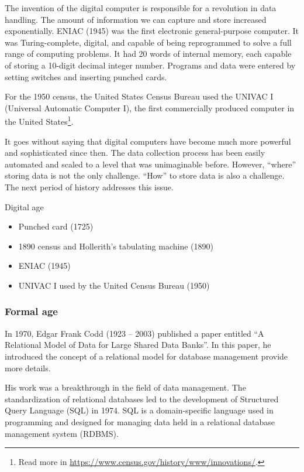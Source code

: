 The invention of the digital computer is responsible for a revolution in data handling.
The amount of information we can capture and store increased exponentially.  ENIAC (1945) was
the first electronic general-purpose computer.  It was Turing-complete, digital, and
capable of being reprogrammed to solve a full range of computing problems.
It had 20 words of internal memory, each capable of storing a 10-digit decimal integer number.
Programs and data were entered by setting switches and inserting punched cards.

For the 1950 census, the United States Census Bureau used the
UNIVAC I (Universal Automatic Computer I), the first commercially produced computer in the
United States\footnote{Read more in \url{https://www.census.gov/history/www/innovations/}.}.

It goes without saying that digital computers have become much more powerful and
sophisticated since then.  The data collection process has been easily automated and
scaled to a level that was unimaginable before.  However, ``where'' storing data is
not the only challenge.  ``How'' to store data is also a challenge.  The next period of
history addresses this issue.

\begin{slidebox}{Digital age}{}
  \begin{itemize}
    \item Punched card (1725)
    \item 1890 census and Hollerith's tabulating machine (1890)
    \item ENIAC (1945)
    \item UNIVAC I used by the United Census Bureau (1950)
  \end{itemize}
\end{slidebox}

\subsubsection{Formal age}

In 1970, Edgar Frank Codd (1923 -- 2003) published a paper entitled ``A Relational Model
of Data for Large Shared Data Banks''.  In this paper, he introduced
the concept of a relational model for database management {\color{red}
provide more details}.

His work was a breakthrough in the field of data management.  The standardization of
relational databases led to the development of Structured Query Language (SQL) in 1974.
SQL is a domain-specific language used in programming and designed for managing data held
in a relational database management system (RDBMS).

